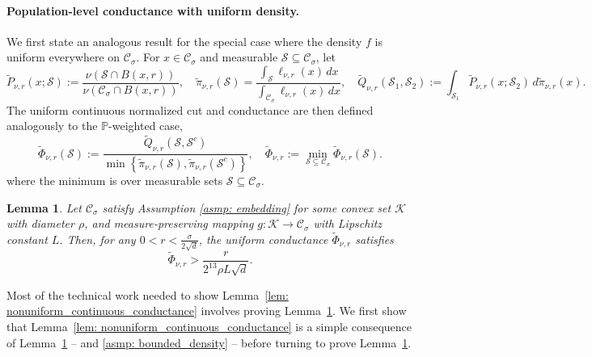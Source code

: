 \documentclass[11pt,twoside]{article}
\newtheorem{lemma}{Lemma}
\newcommand{\set}[1]{\left\{#1\right\}}
\newcommand{\1}{\mathbf{1}}
\newcommand{\Pbb}{\mathbb{P}}
\newcommand{\Sset}{\mathcal{S}}
\newcommand{\Cset}{\mathcal{C}}
\newcommand{\Csig}{\Cset_{\sigma}}
\newcommand{\dx}{\,dx}
\begin{document}
\paragraph{Population-level conductance with uniform density.}
We first state an analogous result for the special case where the density $f$ is uniform everywhere on $\Csig$. For $x \in \Csig$ and measurable $\Sset \subseteq \Csig$, let 
\begin{equation*}
\widetilde{P}_{\nu,r}(x; \Sset) := \frac{\nu(\Sset \cap B(x,r))}{\nu(\Csig \cap B(x,r))}, \quad \widetilde{\pi}_{\nu,r}(\Sset) = \frac{\int_{\Sset} \ell_{\nu,r}(x) \dx}{\int_{\Csig} \ell_{\nu,r}(x) \dx}, \quad  \widetilde{Q}_{\nu,r}(\Sset_1,\Sset_2) := \int_{\Sset_1} \widetilde{P}_{\nu,r}(x;\Sset_2) \,d\widetilde{\pi}_{\nu,r}(x).
\end{equation*}
The uniform continuous normalized cut and conductance are then defined analogously to the $\Pbb$-weighted case,
\begin{equation*}
\widetilde{\Phi}_{\nu,r}(\Sset) := \frac{\widetilde{Q}_{\nu,r}(\Sset, \Sset^c)}{\min\set{\widetilde{\pi}_{\nu,r}(\Sset),\widetilde{\pi}_{\nu,r}(\Sset^c)}}, \quad \widetilde{\Phi}_{\nu,r} := \min_{\Sset \subseteq \Csig} \widetilde{\Phi}_{\nu,r}(\Sset).
\end{equation*}
where the minimum is over measurable sets $\Sset \subseteq \Csig$.

\begin{lemma}
	\label{lem: uniform_continuous_conductance}
	Let $\Csig$ satisfy Assumption \ref{asmp: embedding} for some convex set $\mathcal{K}$ with diameter $\rho$, and measure-preserving mapping $g: \mathcal{K} \to \Csig$ with Lipschitz constant $L$. Then, for any $0 < r < \frac{\sigma}{2\sqrt{d}}$, the uniform conductance $\widetilde{\Phi}_{\nu,r}$ satisfies
	\begin{equation*}
	\widetilde{\Phi}_{\nu,r} > \frac{r}{2^{13} \rho L \sqrt{d}}.
	\end{equation*}
\end{lemma}

Most of the technical work needed to show Lemma~\ref{lem: nonuniform_continuous_conductance} involves proving Lemma~\ref{lem: uniform_continuous_conductance}. We first show that  Lemma~\ref{lem: nonuniform_continuous_conductance} is a simple consequence of Lemma~\ref{lem: uniform_continuous_conductance} -- and \ref{asmp: bounded_density} -- before turning to prove Lemma~\ref{lem: uniform_continuous_conductance}.
\end{document}
